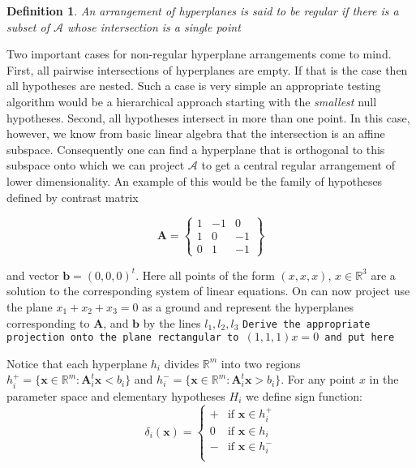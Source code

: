 \documentclass[a4paper,12pt]{article}
\newtheorem{definition}{Definition}
\newcommand{\bs}[1]{\boldsymbol{#1}}
\newcommand{\R}{\mathbb{R}}
\begin{document}
\begin{definition}
  An arrangement of hyperplanes is said to be regular if there is a
  subset of $\mathscr{A}$ whose intersection is a single point
\end{definition}

Two important cases for non-regular hyperplane arrangements come to
mind. First, all pairwise intersections of hyperplanes are empty. If
that is the case then all hypotheses are nested. Such a case is very
simple an appropriate testing algorithm would be a hierarchical
approach starting with the {\em smallest} null hypotheses. Second, all
hypotheses intersect in more than one point. In this case, however, we
know from basic linear algebra that the intersection is an affine
subspace. Consequently one can find a hyperplane that is orthogonal to
this subspace onto which we can project $\mathscr{A}$ to get a central
regular arrangement of lower dimensionality. An example of this would
be the family of hypotheses defined by contrast matrix

\begin{equation}
  \label{eq:example:ordered}
  \bs{A} = \left\{
    \begin{array}{ccc}
      1 & -1 & 0 \\
      1 & 0 & -1 \\
      0 & 1 & -1 
    \end{array}
  \right\}
\end{equation}

and vector $\bs{b} = (0,0,0)^t$. Here all points of the form $(x,x,x)$, $x
\in \R^3$ are a solution to the corresponding system of linear
equations. On can now project use the plane $x_1 + x_2 + x_3 = 0$ as a
ground and represent the hyperplanes corresponding to $\bs{A}$, and
$\bs{b}$ by the lines $l_1,l_2,l_3$
{\tt Derive the appropriate projection onto the plane rectangular to
  $(1,1,1)x=0$ and put here}


Notice that each hyperplane $h_i$ divides
$\mathbb{R}^m$ into two regions $h_i^+ = \{\bs{x} \in \mathbb{R}^m:
\bs{A}_i^t\bs{x} < b_i\}$ and $h_i^- = \{\bs{x} \in \mathbb{R}^m: \bs{A}_i^t\bs{x} >
b_i\}$. For any point $x$ in the parameter space and elementary
hypotheses $H_i$ we define sign function: 
\begin{equation}
  \label{eq:sign}
  \delta_i(\bs{x}) = \left\{
\begin{array}{ll}
  + & \text{if } \bs{x} \in h_i^+\\
  0 & \text{if } \bs{x} \in h_i \\
  - & \text{if } \bs{x} \in h_i^-\\
\end{array}\right.
\end{equation}
\end{document}
